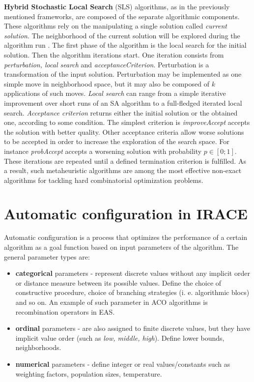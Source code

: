 \documentclass[12pt]{article}
\begin{document}
\textbf{Hybrid Stochastic Local Search} (SLS) algorithms, as in the previously mentioned frameworks, are composed of the separate algorithmic components. These algorithms rely on the manipulating a single solution called \emph{current solution}. The neighborhood of the current solution will be explored during the algorithm run \cite{hsls}. The first phase of the algorithm is the local search for the initial solution. Then the algorithm iterations start. One iteration consists from \emph{perturbation, local search} and \emph{acceptanceCriterion}. Perturbation is a transformation of the input solution. Perturbation may be implemented as one simple move in neighborhood space, but it may also be composed of $k$ applications of such moves. \emph{Local search} can range from a simple iterative improvement over short runs of an SA algorithm to a full-fledged iterated local search. \emph{Acceptance criterion} returns either the initial solution or the obtained one, according to some condition. The simplest criterion is \emph{improveAccept} accepts the solution with better quality. Other acceptance criteria allow worse solutions to be accepted in order to increase the exploration of the search space. For instance \emph{probAccept} accepts a worsening solution with probability $p \in [0;1]$. These iterations are repeated until a defined termination criterion is fulfilled. As a result, such metaheuristic algorithms are among the most effective non-exact algorithms for tackling hard combinatorial optimization problems.


\section{Automatic configuration in IRACE}

Automatic configuration is a process that optimizes the performance of a certain algorithm as a goal function based on input parameters of the algorithm. The general parameter types are:
 
\begin{itemize}
\item \textbf{categorical} parameters - represent discrete values without any implicit order or distance measure between its possible values. Define the choice of constructive procedure, choice of branching strategies (i. e. algorithmic blocs) and so on. An example of such parameter in ACO algorithms is recombination operators in EAS.
\item \textbf{ordinal} parameters - are also assigned to finite discrete values, but they have implicit value order (such as \emph{low, middle, high}). Define lower bounds, neighborhoods.
\item \textbf{numerical} parameters - define integer or real values/constants such as weighting factors, population sizes, temperature.
\end{itemize}
\end{document}
